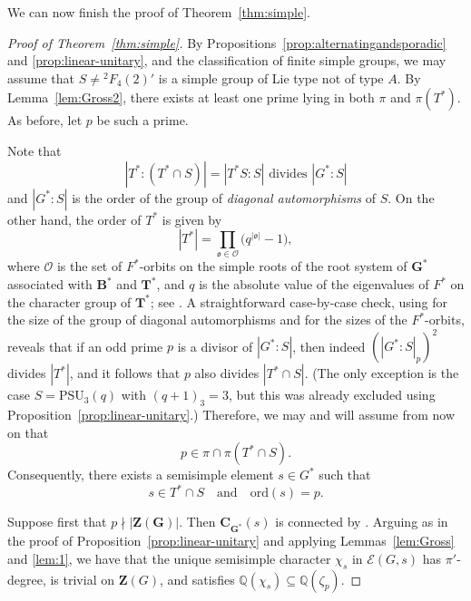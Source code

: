 \documentclass[12pt]{amsart}
\theoremstyle{definition}
\numberwithin{equation}{section}
\newcommand{\PSU}{{\mathrm {PSU}}}
\newcommand{\ord}{{\mathrm {ord}}}
\newcommand{\QQ}{{\mathbb Q}}
\newcommand{\EC}{\mathcal{E}}
\newcommand{\bC}{{\mathbf{C}}}
\newcommand{\bG}{{\mathbf{G}}}
\newcommand{\bT}{{\mathbf{T}}}
\newcommand{\bB}{{\mathbf{B}}}
\newcommand{\bZ}{{\mathbf{Z}}}
\begin{document}
We can now finish the proof of Theorem~\ref{thm:simple}.

\begin{proof}[Proof of Theorem~\ref{thm:simple}]
By Propositions~\ref{prop:alternatingandsporadic} and
\ref{prop:linear-unitary}, and the classification of finite simple
groups, we may assume %
that $S \neq {}^2F_4(2)'$ is %
a simple group of
Lie type not of type $A$. By Lemma~\ref{lem:Gross2}, there exists at
least one prime lying in both $\pi$ and $\pi(T^*)$. As before, let
$p$ be such a prime.

Note that
\[
|T^*:(T^*\cap S)| = |T^*S:S| \text{ divides } |G^*:S|
\]
and $|G^*:S|$ is the order of the group of \emph{diagonal
automorphisms} of $S$. On the other hand, the order of $T^*$ is
given %
by
\[
|T^*|=\prod_{\mathfrak{o}\in \mathcal{O}}
\bigl(q^{|\mathfrak{o}|}-1\bigr),
\]
where %
$\mathcal{O}$ is the set of $F^*$-orbits on the simple roots
of the root system of $\bG^*$ associated with $\bB^*$ and $\bT^*$,
and $q$ is the absolute value of the eigenvalues of $F^*$ on the
character group of $\bT^*$; see \cite[p.~74]{Carter85}. A
straightforward case-by-case check, using \cite[Table~5]{Atl1} for
the size of the group of diagonal automorphisms and
\cite[\S1.19]{Carter85} for the sizes of the $F^*$-orbits, reveals
that if an odd prime $p$ is a divisor of $|G^*:S|$, then indeed
$(|G^*:S|_p)^2$ divides $|T^*|$, and it follows that $p$ also
divides $|T^*\cap S|$. (The only exception is the case $S=\PSU_3(q)$
with $(q+1)_3=3$, but this was already excluded using
Proposition~\ref{prop:linear-unitary}.) Therefore, we may and will
assume from now on that \[p\in \pi\cap \pi(T^*\cap S).\]
Consequently, there exists a semisimple %
element $s\in G^*$ such %
that
\[
s\in T^*\cap S \quad\text{and}\quad \ord(s)=p.
\]

Suppose %
first that $p\nmid |\bZ(\bG)|$. Then $\bC_{\bG^*}(s)$ is
connected by \cite[Corollary~4.6]{Borel70}. Arguing as in the proof
of Proposition~\ref{prop:linear-unitary} and applying
Lemmas~\ref{lem:Gross} and \ref{lem:1}, we have that the unique
semisimple character $\chi_s$ in $\EC(G,s)$ has $\pi'$-degree, is
trivial on $\bZ(G)$, and satisfies $\QQ(\chi_s)\subseteq
\QQ(\zeta_p)$.


\end{proof}
\end{document}
